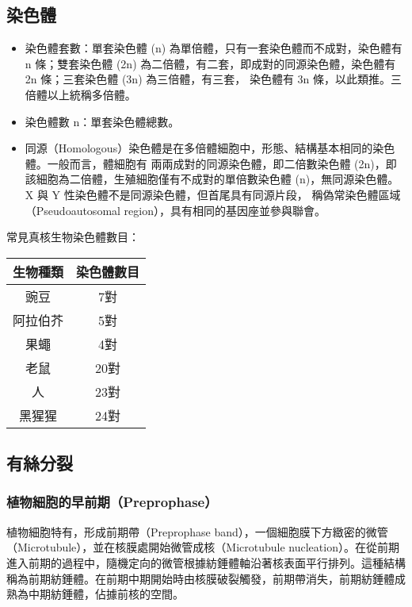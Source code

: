 \documentclass[a4paper,12pt]{report}
\begin{document}
\subsection{染色體}
\begin{itemize}
  \item 染色體套數：單套染色體 (n) 為單倍體，只有一套染色體而不成對，染色體有 n 條；雙套染色體 (2n) 為二倍體，有二套，即成對的同源染色體，染色體有 2n 條；三套染色體 (3n) 為三倍體，有三套， 染色體有 3n 條，以此類推。三倍體以上統稱多倍體。
  \item 染色體數 n：單套染色體總數。
  \item 同源（Homologous）染色體是在多倍體細胞中，形態、結構基本相同的染色體。一般而言，體細胞有 兩兩成對的同源染色體，即二倍數染色體 (2n)，即該細胞為二倍體，生殖細胞僅有不成對的單倍數染色體 (n)，無同源染色體。X 與 Y 性染色體不是同源染色體，但首尾具有同源片段， 稱偽常染色體區域（Pseudoautosomal region），具有相同的基因座並參與聯會。
\end{itemize}
常見真核生物染色體數目：
\begin{center}
\begin{tabular}{|c|c|}
\hline
生物種類 & 染色體數目 \\ \hline
豌豆 & 7對 \\ \hline
阿拉伯芥 & 5對 \\ \hline
果蠅 & 4對 \\ \hline
老鼠 & 20對 \\ \hline
人 & 23對 \\ \hline
黑猩猩 & 24對 \\ \hline
\end{tabular}
\end{center}
\subsection{有絲分裂}
\subsubsection{植物細胞的早前期（Preprophase）}
植物細胞特有，形成前期帶（Preprophase band），一個細胞膜下方緻密的微管（Microtubule），並在核膜處開始微管成核（Microtubule nucleation）。在從前期進入前期的過程中，隨機定向的微管根據紡錘體軸沿著核表面平行排列。這種結構稱為前期紡錘體。在前期中期開始時由核膜破裂觸發，前期帶消失，前期紡錘體成熟為中期紡錘體，佔據前核的空間。
\end{document}

